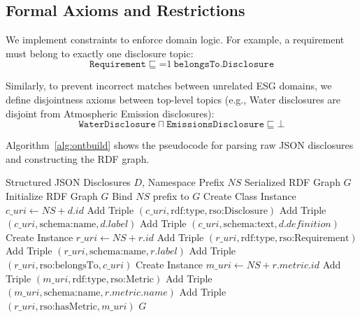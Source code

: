 \documentclass[journal,compsoc]{IEEEtran}
\begin{document}
\begin{itemize}
\subsection{Formal Axioms and Restrictions}
We implement constraints to enforce domain logic. For example, a requirement must belong to exactly one disclosure topic:
\begin{equation}
\texttt{Requirement} \sqsubseteq \mathord{=} 1\ \texttt{belongsTo}.\texttt{Disclosure}
\end{equation}

Similarly, to prevent incorrect matches between unrelated ESG domains, we define disjointness axioms between top-level topics (e.g., Water disclosures are disjoint from Atmospheric Emission disclosures):
\begin{equation}
\texttt{WaterDisclosure} \sqcap \texttt{EmissionsDisclosure} \sqsubseteq \bot
\end{equation}

Algorithm~\ref{alg:ontbuild} shows the pseudocode for parsing raw JSON disclosures and constructing the RDF graph.

\begin{algorithm}
\caption{Ontology Construction Pipeline}
\label{alg:ontbuild}
\begin{algorithmic}[1]
\REQUIRE Structured JSON Disclosures $D$, Namespace Prefix $NS$
\ENSURE Serialized RDF Graph $G$
\STATE Initialize RDF Graph $G$
\STATE Bind $NS$ prefix to $G$
    \STATE Create Class Instance $c\_uri \leftarrow NS + d.id$
    \STATE Add Triple $(c\_uri, \text{rdf:type}, \text{rso:Disclosure})$
    \STATE Add Triple $(c\_uri, \text{schema:name}, d.label)$
    \STATE Add Triple $(c\_uri, \text{schema:text}, d.definition)$
        \STATE Create Instance $r\_uri \leftarrow NS + r.id$
        \STATE Add Triple $(r\_uri, \text{rdf:type}, \text{rso:Requirement})$
        \STATE Add Triple $(r\_uri, \text{schema:name}, r.label)$
        \STATE Add Triple $(r\_uri, \text{rso:belongsTo}, c\_uri)$
            \STATE Create Instance $m\_uri \leftarrow NS + r.metric.id$
            \STATE Add Triple $(m\_uri, \text{rdf:type}, \text{rso:Metric})$
            \STATE Add Triple $(m\_uri, \text{schema:name}, r.metric.name)$
            \STATE Add Triple $(r\_uri, \text{rso:hasMetric}, m\_uri)$
        \ENDIF
    \ENDFOR
\ENDFOR
\RETURN $G$
\end{algorithmic}
\end{algorithm}


\end{itemize}
\end{document}
